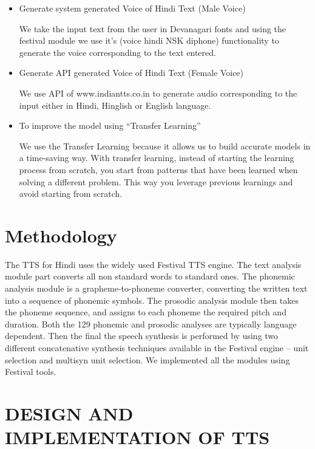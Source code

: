 \documentclass{article}
\begin{document}
\begin{itemize}
    \item \textbf \Large {Generate system generated Voice of Hindi Text (Male Voice)}
    
       \large We take the input text from the user in Devanagari fonts and using the festival module we use it's (voice hindi NSK diphone) functionality to generate the voice corresponding to the text entered. 
    \item \textbf \Large {Generate API generated Voice of Hindi Text (Female Voice)}
        
        \large We use API of \cite{indianTTS}www.indiantts.co.in to generate audio corresponding to the input either in Hindi, Hinglish or English language.  
    \item \textbf \Large {To improve the model using “Transfer Learning”}
        
        \large We use the Transfer Learning because it allows us to build accurate models in a time-saving way. With transfer learning, instead of starting the learning process from scratch, you start from patterns that have been learned when solving a different problem. This way you leverage previous learnings and avoid starting from scratch.
   
\end{itemize}

\newpage
\section{Methodology}

\large The TTS for Hindi uses the widely used \cite{festival} Festival 
TTS engine. The text analysis module part converts all 
non standard words to standard ones. The phonemic 
analysis module is a grapheme-to-phoneme converter,
converting the written text into a sequence of 
phonemic symbols. The prosodic analysis module then
takes the phoneme sequence, and assigns to each 
phoneme the required pitch and duration. Both the 
129
phonemic and prosodic analyses are typically language 
dependent. Then the final the speech synthesis is 
performed by using two different concatenative 
synthesis techniques available in the Festival engine –
unit selection and multisyn unit selection. We 
implemented all the modules using Festival tools.

\newpage
\section{DESIGN AND IMPLEMENTATION OF TTS}
\end{document}

